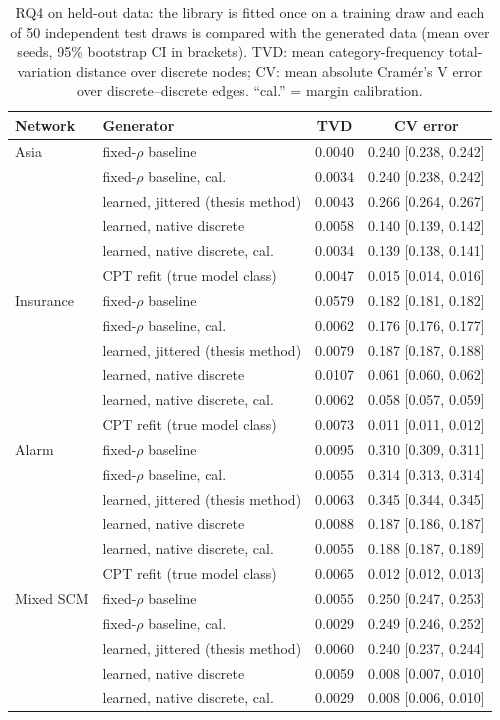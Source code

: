 \documentclass[
  english,
  class=report,
  accentcolor=2c,
  marginpar=false,
  parskip=half-,
  fontsize=11pt,
  ruledheaders=false,
  pdfa=false,
  IMRAD=false,
  thesis={type=master}
]{tudapub}
\begin{document}
\begin{table}[ht]
\caption{RQ4 on held-out data: the library is fitted once on a training draw and each of 50 independent test draws is compared with the generated data (mean over seeds, 95\% bootstrap CI in brackets). TVD: mean category-frequency total-variation distance over discrete nodes; CV: mean absolute Cram\'er's V error over discrete--discrete edges. ``cal.'' = margin calibration.}
\label{tab:rq4}
\centering
\small
\begin{tabular}{llcc}
\toprule
\textbf{Network} & \textbf{Generator} & \textbf{TVD} & \textbf{CV error} \\
\midrule
Asia & fixed-$\rho$ baseline & 0.0040 & 0.240 [0.238, 0.242] \\
 & fixed-$\rho$ baseline, cal. & 0.0034 & 0.240 [0.238, 0.242] \\
 & learned, jittered (thesis method) & 0.0043 & 0.266 [0.264, 0.267] \\
 & learned, native discrete & 0.0058 & 0.140 [0.139, 0.142] \\
 & learned, native discrete, cal. & 0.0034 & 0.139 [0.138, 0.141] \\
 & CPT refit (true model class) & 0.0047 & 0.015 [0.014, 0.016] \\
\addlinespace
Insurance & fixed-$\rho$ baseline & 0.0579 & 0.182 [0.181, 0.182] \\
 & fixed-$\rho$ baseline, cal. & 0.0062 & 0.176 [0.176, 0.177] \\
 & learned, jittered (thesis method) & 0.0079 & 0.187 [0.187, 0.188] \\
 & learned, native discrete & 0.0107 & 0.061 [0.060, 0.062] \\
 & learned, native discrete, cal. & 0.0062 & 0.058 [0.057, 0.059] \\
 & CPT refit (true model class) & 0.0073 & 0.011 [0.011, 0.012] \\
\addlinespace
Alarm & fixed-$\rho$ baseline & 0.0095 & 0.310 [0.309, 0.311] \\
 & fixed-$\rho$ baseline, cal. & 0.0055 & 0.314 [0.313, 0.314] \\
 & learned, jittered (thesis method) & 0.0063 & 0.345 [0.344, 0.345] \\
 & learned, native discrete & 0.0088 & 0.187 [0.186, 0.187] \\
 & learned, native discrete, cal. & 0.0055 & 0.188 [0.187, 0.189] \\
 & CPT refit (true model class) & 0.0065 & 0.012 [0.012, 0.013] \\
\addlinespace
Mixed SCM & fixed-$\rho$ baseline & 0.0055 & 0.250 [0.247, 0.253] \\
 & fixed-$\rho$ baseline, cal. & 0.0029 & 0.249 [0.246, 0.252] \\
 & learned, jittered (thesis method) & 0.0060 & 0.240 [0.237, 0.244] \\
 & learned, native discrete & 0.0059 & 0.008 [0.007, 0.010] \\
 & learned, native discrete, cal. & 0.0029 & 0.008 [0.006, 0.010] \\
\bottomrule
\end{tabular}
\end{table}
\end{document}
